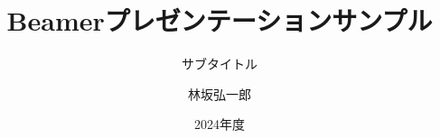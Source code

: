 \documentclass[12pt,dvipdfmx,aspectratio=169]{beamer}
\title{Beamerプレゼンテーションサンプル}
\subtitle{サブタイトル}
\author{林坂弘一郎}
\date{2024年度}
\institute[神戸学院大学]{神戸学院大学 経営学部}
\theoremstyle{example}
\begin{document}
\frame{\titlepage}
\section[Outline]{}
\frame{\tableofcontents}

\end{document}
